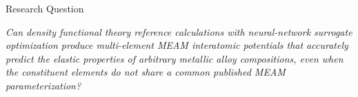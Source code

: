 \begin{frame}{Research Question}
\begin{block}{}
\centering
\emph{Can density functional theory reference calculations with neural-network surrogate optimization produce multi-element MEAM interatomic potentials that accurately predict the elastic properties of arbitrary metallic alloy compositions, even when the constituent elements do not share a common published MEAM parameterization?}
\end{block}
\end{frame}
